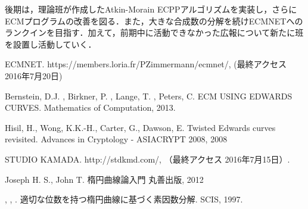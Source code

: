 \documentclass[openany,11pt,papersize]{jsbook}
\begin{document}
後期は，理論班が作成したAtkin-Morain ECPPアルゴリズムを実装し，さらにECMプログラムの改善を図る．また，大きな合成数の分解を続けECMNETへのランクインを目指す．加えて，前期中に活動できなかった広報について新たに班を設置し活動していく．





\begin{appendix}
\end{appendix}



\begin{thebibliography}{9}

\newblock ECMNET.
\newblock https://members.loria.fr/PZimmermann/ecmnet/, (最終アクセス 2016年7月20日)

\newblock Bernstein, D.J. , Birkner, P. , Lange, T. , Peters, C.
\newblock ECM USING EDWARDS CURVES.
\newblock Mathematics of Computation, 2013.

\newblock Hisil, H., Wong, K.K.-H., Carter, G., Dawson, E.
\newblock Twisted Edwards curves revisited.
\newblock Advances in Cryptology - ASIACRYPT 2008, 2008

\newblock STUDIO KAMADA. 
\newblock http://stdkmd.com/, （最終アクセス 2016年7月15日）.

\newblock Joseph H. S., John T.
\newblock 楕円曲線論入門
\newblock 丸善出版, 2012

{}{},
 {}{},
 {}{}.
\newblock 適切な位数を持つ楕円曲線に基づく素因数分解.
\newblock SCIS, 1997.
\end{thebibliography}
\end{document}
